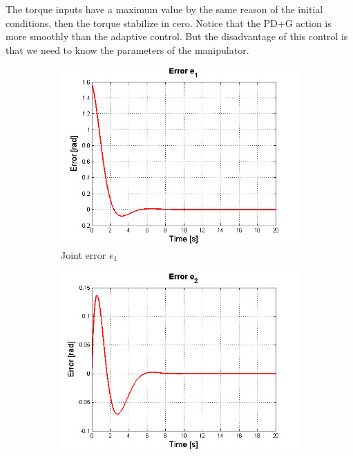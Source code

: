 The torque inputs have a maximum value by the same reason of the initial conditions, then the torque stabilize in cero. Notice that the PD+G action is more smoothly than the adaptive control. But the disadvantage of this control is that we need to know the parameters of the manipulator.\\

\begin{figure}[tb]
\centering
\begin{subfigure}[b]{0.4\textwidth}
    \includegraphics[width=\textwidth] {imagenes/6-neuronal/e1g.png}
    \caption{Joint error $e_1$}
    \label{fig:e1g}
\end{subfigure}
\begin{subfigure}[b]{0.4\textwidth}
    \includegraphics[width=\textwidth] {imagenes/6-neuronal/e2g.png}

\end{subfigure}
\end{figure}
